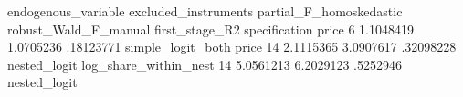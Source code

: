 endogenous_variable	excluded_instruments	partial_F_homoskedastic	robust_Wald_F_manual	first_stage_R2	specification
price	6	1.1048419	1.0705236	.18123771	simple_logit_both
price	14	2.1115365	3.0907617	.32098228	nested_logit
log_share_within_nest	14	5.0561213	6.2029123	.5252946	nested_logit

